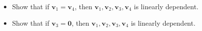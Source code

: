 \documentclass[12pt]{article}
\begin{document}
\begin{enumerate}[1.]
  \begin{itemize}
  \item   Show that if \(\mathbf{v}_1 = \mathbf{v}_4\), then \(\mathbf{v}_1,\mathbf{v}_2,\mathbf{v}_3,\mathbf{v}_4\) is linearly dependent.
    \vfill
  \item Show that if \(\mathbf{v}_3 = \mathbf{0}\),  then \(\mathbf{v}_1,\mathbf{v}_2,\mathbf{v}_3,\mathbf{v}_4\) is linearly dependent.
    \vfill
  \end{itemize}
\eject\end{enumerate} 
\end{document}
